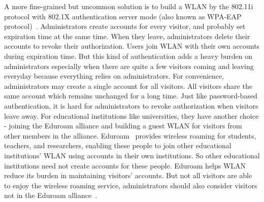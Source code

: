 A more fine-grained but uncommon solution is to build a WLAN by the 802.11i protocol with 802.1X authentication server mode (also known as WPA-EAP protocol)~\cite{akhlaq2007comparative}. Administrators create accounts for every visitor, and probably set expiration time at the same time. When they leave, administrators delete their accounts to revoke their authorization. Users join WLAN with their own accounts during expiration time. But this kind of authentication adds a heavy burden on administrators especially when there are quite a few visitors coming and leaving everyday because everything relies on administrators. For convenience, administrators may create a single account for all visitors. All visitors share the same account which remains unchanged for a long time. Just like password-based authentication, it is hard for administrators to revoke authorization when visitors leave away. For educational institutions like universities, they have another choice - joining the Eduroam alliance and building a guest WLAN for visitors from other members in the alliance. Eduroam ~\cite{florio2005eduroam}provides wireless roaming for students, teachers, and researchers, enabling these people to join other educational institutions’ WLAN using accounts in their own institutions. So other educational institutions need not create accounts for these people. Eduroam helps WLAN reduce its burden in maintaining visitors’ accounts. But not all visitors are able to enjoy the wireless roaming service, administrators should also consider visitors not in the Eduroam alliance~\cite{Ó2007Deploying}. 


